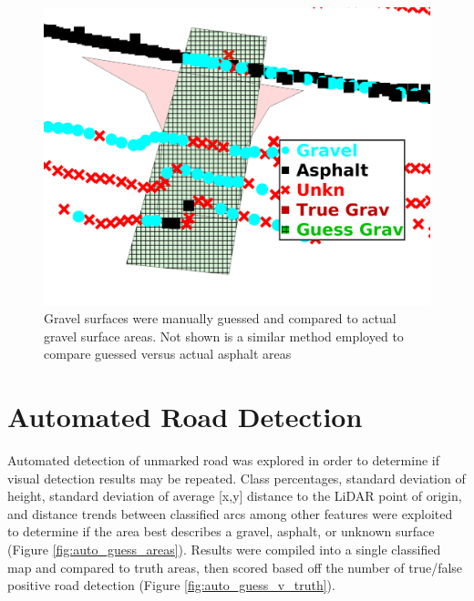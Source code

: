 \documentclass[numbered,pdftex]{ohio-etd}
\begin{document}
{{		\begin{figure}[H]
			\centering
			\includegraphics[width=0.9\linewidth]{Defense_Images/rm_db_6_overlap_2}
			\caption[Projected Visual Guess vs Truth]{Gravel surfaces were manually guessed and compared to actual gravel surface areas. Not shown is a similar method employed to compare guessed versus actual asphalt areas}
			\label{fig:rm_db_6_overlap_2}
		\end{figure}	

	}
	
	\section{Automated Road Detection}\label{sec:auto_road_detection}{
		
		{Automated detection of unmarked road was explored in order to determine if visual detection results may be repeated. Class percentages, standard deviation of height, standard deviation of average [x,y] distance to the LiDAR point of origin, and distance trends between classified arcs among other features were exploited to determine if the area best describes a gravel, asphalt, or unknown surface (Figure \ref{fig:auto_guess_areas}). Results were compiled into a single classified map and compared to truth areas, then scored based off the number of true/false positive road detection (Figure \ref{fig:auto_guess_v_truth}).}	
		
}}
\end{document}
